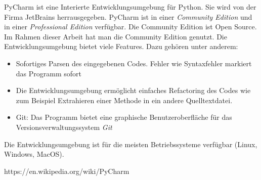PyCharm ist eine Interierte Entwicklungsumgebung für Python. Sie wird von der Firma JetBrains herrausgegeben. PyCharm ist in einer \textit{Community Edition} und in einer \textit{Professional Edition} verfügbar. Die Community Edition ist Open Source. Im Rahmen dieser Arbeit hat man die Community Edition genutzt. Die Entwicklungsumgebung bietet viele Features. Dazu gehören unter anderem:
\begin{itemize}
\item Sofortiges Parsen des eingegebenen Codes. Fehler wie Syntaxfehler markiert das Programm sofort
\item Die Entwicklungsumgebung ermöglicht einfaches Refactoring des Codes wie zum Beispiel Extrahieren einer Methode in ein andere Quelltextdatei.
\item Git: Das Programm bietet eine graphische Benutzeroberfläche für das Versionsverwaltungssystem \textit{Git} 
\end{itemize} 
Die Entwicklungsumgebung ist für die meisten Betriebssysteme verfügbar (Linux, Windows, MacOS).


https://en.wikipedia.org/wiki/PyCharm 






          
 
